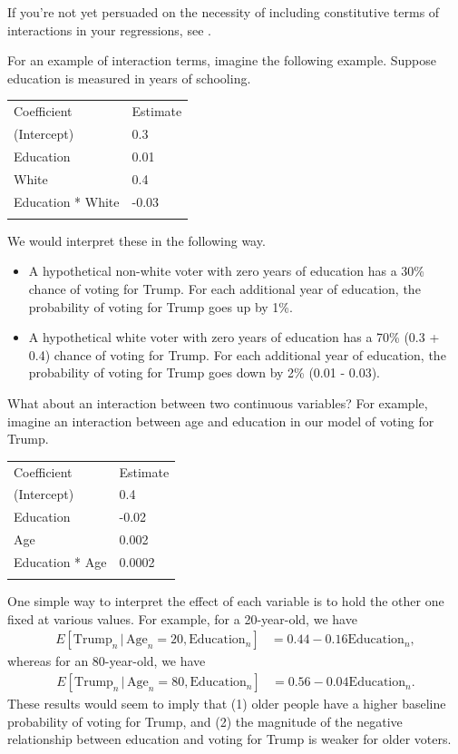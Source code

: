 \documentclass[
  12pt,
  oneside,openany]{book}
\begin{document}
If you're not yet persuaded on the necessity of including constitutive terms of interactions in your regressions, see \citet{braumoeller2004hypothesis}.

For an example of interaction terms, imagine the following example. Suppose education is measured in years of schooling.

\begin{longtable}[]{@{}ll@{}}
\toprule
Coefficient & Estimate \\ \addlinespace
\midrule
\endhead
(Intercept) & 0.3 \\ \addlinespace
Education & 0.01 \\ \addlinespace
White & 0.4 \\ \addlinespace
Education * White & -0.03 \\ \addlinespace
\bottomrule
\end{longtable}

We would interpret these in the following way.

\begin{itemize}
\item
  A hypothetical non-white voter with zero years of education has a 30\% chance of voting for Trump. For each additional year of education, the probability of voting for Trump goes up by 1\%.
\item
  A hypothetical white voter with zero years of education has a 70\% (0.3 + 0.4) chance of voting for Trump. For each additional year of education, the probability of voting for Trump goes down by 2\% (0.01 - 0.03).
\end{itemize}

What about an interaction between two continuous variables? For example, imagine an interaction between age and education in our model of voting for Trump.

\begin{longtable}[]{@{}ll@{}}
\toprule
Coefficient & Estimate \\ \addlinespace
\midrule
\endhead
(Intercept) & 0.4 \\ \addlinespace
Education & -0.02 \\ \addlinespace
Age & 0.002 \\ \addlinespace
Education * Age & 0.0002 \\ \addlinespace
\bottomrule
\end{longtable}

One simple way to interpret the effect of each variable is to hold the other one fixed at various values. For example, for a 20-year-old, we have
\[
\begin{aligned}
E[\text{Trump}_n \,|\, \text{Age}_n = 20, \text{Education}_n] &= 0.44 - 0.16 \text{Education}_n,
\end{aligned}
\]
whereas for an 80-year-old, we have
\[
\begin{aligned}
E[\text{Trump}_n \,|\, \text{Age}_n = 80, \text{Education}_n] &= 0.56 - 0.04 \text{Education}_n.
\end{aligned}
\]
These results would seem to imply that (1) older people have a higher baseline probability of voting for Trump, and (2) the magnitude of the negative relationship between education and voting for Trump is weaker for older voters.
\end{document}
